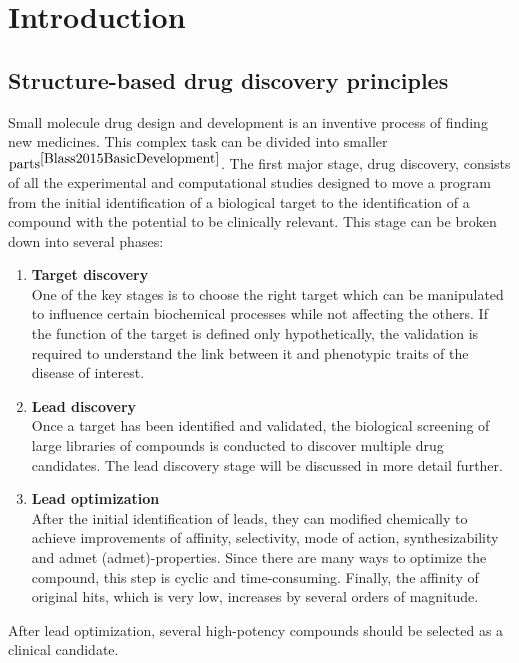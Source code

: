 \chapter{Introduction}
\section{Structure-based drug discovery principles}
Small molecule drug design and development is an inventive process of finding new medicines.
This complex task can be divided into smaller $\text{parts}^{\cite{Blass2015BasicDevelopment}}$. 
The first major stage, drug discovery, consists of all the experimental and computational studies designed to move a program from the initial identification of a biological target to the identification of a compound with the potential to be clinically relevant.
This stage can be broken down into several phases:
\begin{enumerate}
    \item \textbf{Target discovery}\\
    One of the key stages is to choose the right target which can be manipulated to influence certain biochemical processes while not affecting the others.
    If the function of the target is defined only hypothetically, the validation is required to understand the link between it and phenotypic traits of the disease of interest.
    
    \item \textbf{Lead discovery}\\
    Once a target has been identified and validated, the biological screening of large libraries of compounds is conducted to discover multiple drug candidates.
    The lead discovery stage will be discussed in more detail further.
    
    \item \textbf{Lead optimization}\\
    After the initial identification of leads, they can modified chemically to achieve improvements of  affinity, selectivity, mode of action, synthesizability and \acrshort{admet} (\acrlong{admet})-properties.
    Since there are many ways to optimize the compound, this step is cyclic and time-consuming. Finally, the affinity of \glqq original hits\grqq, which is very low, increases by several orders of magnitude.
\end{enumerate}

After lead optimization, several high-potency compounds should be selected as a clinical candidate.

